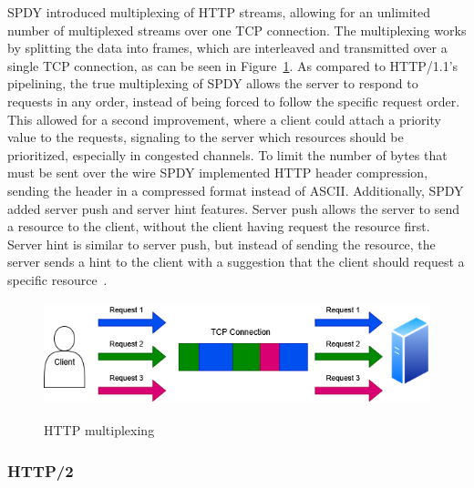 \documentclass[english, 12pt, a4paper, elec, utf8, a-2b, online]{aaltothesis}
\begin{document}
SPDY introduced multiplexing of HTTP streams, allowing for an unlimited number
of multiplexed streams over one TCP connection. The multiplexing works by splitting
the data into frames, which are interleaved and transmitted over a single TCP connection,
as can be seen in Figure~\ref{fig:http_mux}. As compared to HTTP/1.1's pipelining,
the true multiplexing of SPDY allows the server to respond to requests in any order,
instead of being forced to follow the specific request order. This allowed for a second improvement,
where a client could attach a priority value to the requests, signaling to the server
which resources should be prioritized, especially in congested channels. To limit
the number of bytes that must be sent over the wire SPDY implemented HTTP header
compression, sending the header in a compressed format instead of ASCII. Additionally,
SPDY added server push and server hint features. Server push allows the server to
send a resource to the client, without the client having request the resource first.
Server hint is similar to server push, but instead of sending the resource, the
server sends a hint to the client with a suggestion that the client should request
a specific resource~\cite{spdy}.

\begin{figure}[h]
	\centering
	\includegraphics[alt={Block diagram of HTTP multiplexing.}, height=3cm]{./images/http_multiplex.png}
	\caption{HTTP multiplexing}
	\label{fig:http_mux}
\end{figure}

\subsubsection{HTTP/2}
\end{document}
